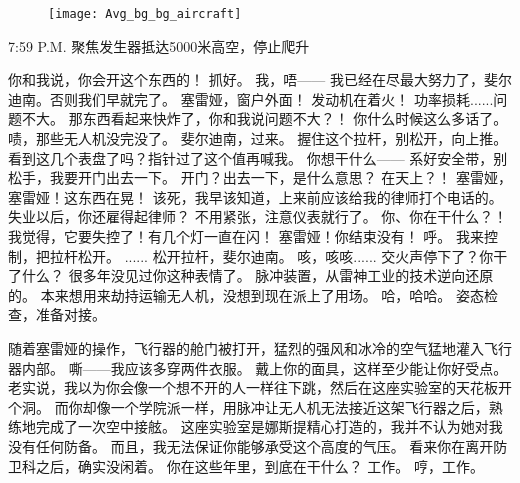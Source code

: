 \documentclass[openany]{book}
\begin{document}
\begin{figure}[h]
    \centering
    \texttt{[image: Avg\_bg\_bg\_aircraft]}
\end{figure}
7:59 P.M. 聚焦发生器抵达5000米高空，停止爬升
\begin{dialogue}
     你和我说，你会开这个东西的！
     抓好。
     我，唔——
     我已经在尽最大努力了，斐尔迪南。否则我们早就完了。
     塞雷娅，窗户外面！
     发动机在着火！
     功率损耗......问题不大。
     那东西看起来快炸了，你和我说问题不大？！
     你什么时候这么多话了。
     啧，那些无人机没完没了。
     斐尔迪南，过来。
     握住这个拉杆，别松开，向上推。
     看到这几个表盘了吗？指针过了这个值再喊我。
     你想干什么——
     系好安全带，别松手，我要开门出去一下。
     开门？出去一下，是什么意思？
     在天上？！
     塞雷娅，塞雷娅！这东西在晃！
     该死，我早该知道，上来前应该给我的律师打个电话的。
     失业以后，你还雇得起律师？
     不用紧张，注意仪表就行了。
     你、你在干什么？！
     我觉得，它要失控了！有几个灯一直在闪！
     塞雷娅！你结束没有！
     呼。
     我来控制，把拉杆松开。
     ......
     松开拉杆，斐尔迪南。
     咳，咳咳......
     交火声停下了？你干了什么？
     很多年没见过你这种表情了。
     脉冲装置，从雷神工业的技术逆向还原的。
     本来想用来劫持运输无人机，没想到现在派上了用场。
     哈，哈哈。
     姿态检查，准备对接。\par
    随着塞雷娅的操作，飞行器的舱门被打开，猛烈的强风和冰冷的空气猛地灌入飞行器内部。
     嘶——我应该多穿两件衣服。
     戴上你的面具，这样至少能让你好受点。
     老实说，我以为你会像一个想不开的人一样往下跳，然后在这座实验室的天花板开个洞。
     而你却像一个学院派一样，用脉冲让无人机无法接近这架飞行器之后，熟练地完成了一次空中接舷。
     这座实验室是娜斯提精心打造的，我并不认为她对我没有任何防备。
     而且，我无法保证你能够承受这个高度的气压。
     看来你在离开防卫科之后，确实没闲着。
     你在这些年里，到底在干什么？
     工作。
     哼，工作。

\end{dialogue}
\end{document}
